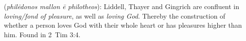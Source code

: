\item[Loving pleasure rather than loving God,]

(\textit{philēdonos mallon ē philotheos}):
Liddell, Thayer and Gingrich are confluent in \emph{loving/fond of pleasure}, as well as \emph{loving God}. Thereby the construction of whether a person loves God with their whole heart or has pleasures higher than him.
Found in 2~Tim 3:4.
